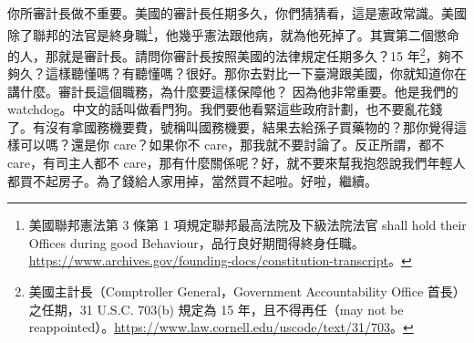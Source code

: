 \hypertarget{c11:cue:22}{}你所審計長做不重要。美國的審計長任期多久，你們猜猜看，這是憲政常識。美國除了聯邦的法官是終身職\footnote{美國聯邦憲法第 3 條第 1 項規定聯邦最高法院及下級法院法官 shall hold their Offices during good Behaviour，品行良好期間得終身任職。\url{https://www.archives.gov/founding-docs/constitution-transcript}。}，他幾乎憲法跟他病，就為他死掉了。其實第二個懲命的人，那就是審計長。請問你審計長按照美國的法律規定任期多久？15 年\footnote{美國主計長（Comptroller General，Government Accountability Office 首長）之任期，31 U.S.C. 703(b) 規定為 15 年，且不得再任（may not be reappointed）。\url{https://www.law.cornell.edu/uscode/text/31/703}。}，夠不夠久？這樣聽懂嗎？有聽懂嗎？很好。那你去對比一下臺灣跟美國，你就知道你在講什麼。審計長這個職務，為什麼要這樣保障他？
\hypertarget{c11:cue:23}{}因為他非常重要。他是我們的 watchdog。中文的話叫做看門狗。我們要他看緊這些政府計劃，也不要亂花錢了。有沒有拿國務機要費，號稱叫國務機要，結果去給孫子買藥物的？那你覺得這樣可以嗎？還是你 care？如果你不 care，那我就不要討論了。反正所謂，都不 care，有司主人都不 care，那有什麼關係呢？好，就不要來幫我抱怨說我們年輕人都買不起房子。為了錢給人家用掉，當然買不起啦。好啦，繼續。


